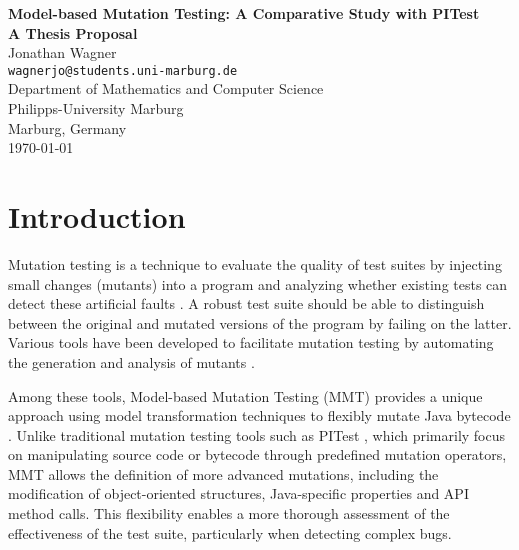 \documentclass[12pt,a4paper]{article}
\begin{document}
\begin{titlepage}
\centering
\vspace*{2cm}

{\Huge\textbf{Model-based Mutation Testing: A Comparative Study with PITest}}\\[1.5cm]

{\Large\textbf{A Thesis Proposal}}\\[2cm]

{\Large Jonathan Wagner}\\[0.5cm]
{\large \texttt{wagnerjo@students.uni-marburg.de}}\\[1.5cm]

{\large Department of Mathematics and Computer Science}\\[0.3cm]
{\large Philipps-University Marburg}\\[0.3cm]
{\large Marburg, Germany}\\[2cm]

{\large \today}

\vfill
\end{titlepage}

\newpage
\tableofcontents

\newpage
\section{Introduction}
Mutation testing is a technique to evaluate the quality of test suites by
injecting small changes (mutants) into a program and analyzing whether existing
tests can detect these artificial faults \cite{offutt_mutation_2001}. A robust
test suite should be able to distinguish between the original and mutated
versions of the program by failing on the latter. Various tools have been
developed to facilitate mutation testing by automating the generation and
analysis of mutants \cite{coles_pit_2016}.

Among these tools, Model-based Mutation Testing (MMT) provides a unique
approach using model transformation techniques to flexibly mutate Java bytecode
\cite{bockisch_mmt_2024, bockisch_mutation_2024}. Unlike traditional mutation
testing tools such as PITest \cite{coles_pit_2016}, which primarily focus on
manipulating source code or bytecode through predefined mutation operators,
MMT allows the definition of more advanced mutations, including the
modification of object-oriented structures, Java-specific properties and API
method calls. This flexibility enables a more thorough assessment of the
effectiveness of the test suite, particularly when detecting complex bugs.
\end{document}
